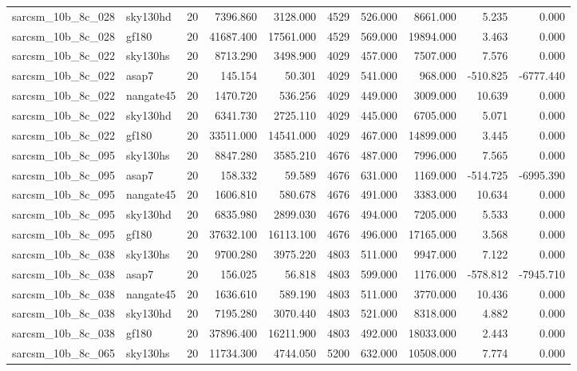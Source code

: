 \begin{longtable}{llrrrrrrrr}
sarcsm\_10b\_8c\_028 & sky130hd & 20 & 7396.860 & 3128.000 & 4529 & 526.000 & 8661.000 & 5.235 & 0.000 \\
sarcsm\_10b\_8c\_028 & gf180 & 20 & 41687.400 & 17561.000 & 4529 & 569.000 & 19894.000 & 3.463 & 0.000 \\
sarcsm\_10b\_8c\_022 & sky130hs & 20 & 8713.290 & 3498.900 & 4029 & 457.000 & 7507.000 & 7.576 & 0.000 \\
sarcsm\_10b\_8c\_022 & asap7 & 20 & 145.154 & 50.301 & 4029 & 541.000 & 968.000 & -510.825 & -6777.440 \\
sarcsm\_10b\_8c\_022 & nangate45 & 20 & 1470.720 & 536.256 & 4029 & 449.000 & 3009.000 & 10.639 & 0.000 \\
sarcsm\_10b\_8c\_022 & sky130hd & 20 & 6341.730 & 2725.110 & 4029 & 445.000 & 6705.000 & 5.071 & 0.000 \\
sarcsm\_10b\_8c\_022 & gf180 & 20 & 33511.000 & 14541.000 & 4029 & 467.000 & 14899.000 & 3.445 & 0.000 \\
sarcsm\_10b\_8c\_095 & sky130hs & 20 & 8847.280 & 3585.210 & 4676 & 487.000 & 7996.000 & 7.565 & 0.000 \\
sarcsm\_10b\_8c\_095 & asap7 & 20 & 158.332 & 59.589 & 4676 & 631.000 & 1169.000 & -514.725 & -6995.390 \\
sarcsm\_10b\_8c\_095 & nangate45 & 20 & 1606.810 & 580.678 & 4676 & 491.000 & 3383.000 & 10.634 & 0.000 \\
sarcsm\_10b\_8c\_095 & sky130hd & 20 & 6835.980 & 2899.030 & 4676 & 494.000 & 7205.000 & 5.533 & 0.000 \\
sarcsm\_10b\_8c\_095 & gf180 & 20 & 37632.100 & 16113.100 & 4676 & 496.000 & 17165.000 & 3.568 & 0.000 \\
sarcsm\_10b\_8c\_038 & sky130hs & 20 & 9700.280 & 3975.220 & 4803 & 511.000 & 9947.000 & 7.122 & 0.000 \\
sarcsm\_10b\_8c\_038 & asap7 & 20 & 156.025 & 56.818 & 4803 & 599.000 & 1176.000 & -578.812 & -7945.710 \\
sarcsm\_10b\_8c\_038 & nangate45 & 20 & 1636.610 & 589.190 & 4803 & 511.000 & 3770.000 & 10.436 & 0.000 \\
sarcsm\_10b\_8c\_038 & sky130hd & 20 & 7195.280 & 3070.440 & 4803 & 521.000 & 8318.000 & 4.882 & 0.000 \\
sarcsm\_10b\_8c\_038 & gf180 & 20 & 37896.400 & 16211.900 & 4803 & 492.000 & 18033.000 & 2.443 & 0.000 \\
sarcsm\_10b\_8c\_065 & sky130hs & 20 & 11734.300 & 4744.050 & 5200 & 632.000 & 10508.000 & 7.774 & 0.000 \\

\end{longtable}
